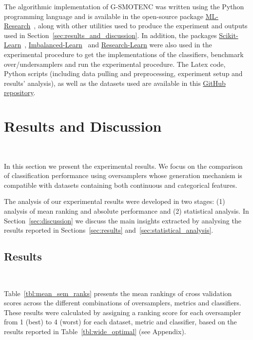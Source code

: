 \documentclass[parskip=full]{scrartcl}
\begin{document}
The algorithmic implementation of G-SMOTENC was written using the Python
programming language and is available in the open-source package
\href{https://github.com/joaopfonseca/ml-research}{ML-Research}~\cite{fonseca2021increasing},
along with other utilities used to produce the experiment and outputs used in
Section~\ref{sec:results_and_discussion}. In addition, the packages
\href{https://github.com/scikit-learn/scikit-learn/}{Scikit-Learn}~\cite{scikit-learn},
\href{https://github.com/scikit-learn-contrib/imbalanced-learn}{Imbalanced-Learn}~\cite{JMLR:v18:16-365}
and \href{https://github.com/georgedouzas/research-learn/}{Research-Learn}
were also used in the experimental procedure to get the implementations of the
classifiers, benchmark over/undersamplers and run the experimental procedure.
The Latex code, Python scripts (including data pulling and preprocessing,
experiment setup and results' analysis), as well as the datasets used are
available in this \href{https://github.com/joaopfonseca/publications}{GitHub
repository}.
 

\section{Results and Discussion}~\label{sec:results_and_discussion}

In this section we present the experimental results. We focus on the
comparison of classification performance using oversamplers whose generation
mechanism is compatible with datasets containing both continuous and
categorical features.

The analysis of our experimental results were developed in two stages: (1)
analysis of mean ranking and absolute performance and (2) statistical
analysis. In Section~\ref{sec:discussion} we discuss the main insights
extracted by analysing the results reported in Sections~\ref{sec:results}
and~\ref{sec:statistical_analysis}.

\subsection{Results}~\label{sec:results}

Table~\ref{tbl:mean_sem_ranks} presents the mean rankings of cross validation
scores across the different combinations of oversamplers, metrics and
classifiers. These results were calculated by assigning a ranking score for
each oversampler from 1 (best) to 4 (worst) for each dataset, metric and
classifier, based on the results reported in Table~\ref{tbl:wide_optimal} (see
Appendix).
\end{document}
